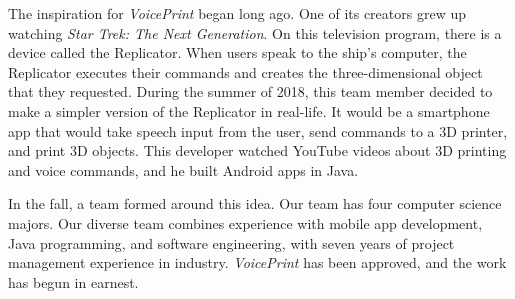 The inspiration for \textit{VoicePrint} began long ago. One of its creators grew up watching \textit{Star Trek: The Next Generation}. On this television program, there is a device called the Replicator. When users speak to the ship's computer, the Replicator executes their commands and creates the three-dimensional object that they requested. During the summer of 2018, this team member decided to make a simpler version of the Replicator in real-life. It would be a smartphone app that would take speech input from the user, send commands to a 3D printer, and print 3D objects. This developer watched YouTube videos about 3D printing and voice commands, and he built Android apps in Java.

In the fall, a team formed around this idea. Our team has four computer science majors. Our diverse team combines experience with mobile app development, Java programming, and software engineering, with seven years of project management experience in industry. \textit{VoicePrint} has been approved, and the work has begun in earnest.